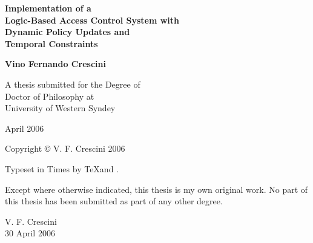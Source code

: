 \documentclass[11pt]{report}
\newenvironment{vcopyright}
{
  \thispagestyle{empty}
  \vspace*{\stretch{10}}
  \begin{center}
}
{
  \end{center}
  \vspace*{\stretch{2}}
  \clearpage
}
\newenvironment{vcertificate}
{
  \thispagestyle{empty}
  \vspace*{\stretch{8}}
}
{
  \vspace*{\stretch{10}}
  \cleardoublepage
}
\begin{document}
  \onehalfspacing


  \pagestyle{fancy}

  \begin{titlepage}
    \begin{center}

      {
        \huge \bf
        Implementation of a \\
        Logic-Based Access Control System with \\
        Dynamic Policy Updates and \\
        Temporal Constraints \\
      }


      {
        \Large \bf
        Vino Fernando Crescini
      }


      {
        \Large
        A thesis submitted for the Degree of \\
        Doctor of Philosophy at \\
        University of Western Syndey \\
      }


      {
        \Large
        April 2006
      }

    \end{center}
  \end{titlepage}

  \begin{vcopyright}
    Copyright \copyright \space
    V. F. Crescini
    2006

    \vspace{1em}

    \small
    Typeset in Times by \TeX \space and \LaTeXe.
  \end{vcopyright}

  \begin{vcertificate}
    \noindent
    Except where otherwise indicated, this thesis is my own original work.
    No part of this thesis has been submitted as part of any other degree.

    \vspace{5em}

    \noindent
    V. F. Crescini \\
    30 April 2006
  \end{vcertificate}
\end{document}
